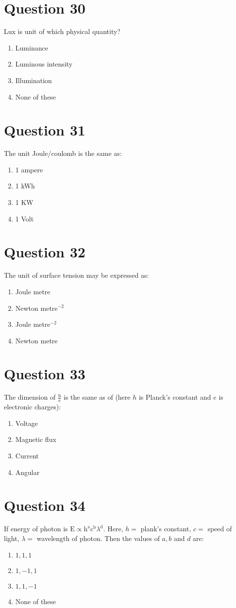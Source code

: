 \documentclass{article}
\begin{document}
\section*{Question 30}
Lux is unit of which physical quantity?
\begin{enumerate}[label=(\alph*)]
\item Luminance
\item Luminous intensity
\item Illumination
\item None of these
\end{enumerate}
\newpage
\section*{Question 31}
The unit Joule/coulomb is the same as:
\begin{enumerate}[label=(\alph*)]
\item 1 ampere
\item 1 kWh
\item 1 KW
\item 1 Volt
\end{enumerate}
\newpage
\section*{Question 32}
The unit of surface tension may be expressed as:
\begin{enumerate}[label=(\alph*)]
\item Joule metre
\item Newton metre\({ }^{-2}\)
\item Joule metre\({ }^{-2}\)
\item Newton metre
\end{enumerate}
\newpage
\section*{Question 33}
The dimension of \(\frac{\mathrm{h}}{\mathrm{e}}\) is the same as of (here \(h\) is Planck's constant and \(e\) is electronic charges):
\begin{enumerate}[label=(\alph*)]
\item Voltage
\item Magnetic flux
\item Current
\item Angular
\end{enumerate}
\newpage
\section*{Question 34}
If energy of photon is \(\mathrm{E} \propto \mathrm{h}^{\mathrm{a}} \mathrm{c}^{\mathrm{b}} \lambda^{\mathrm{d}}\). Here, \(h=\) plank's constant, \(c=\) speed of light, \(\lambda=\) wavelength of photon. Then the values of \(a, b\) and \(d\) are:
\begin{enumerate}[label=(\alph*)]
\item \(1,1,1\)
\item \(1,-1,1\)
\item \(1,1,-1\)
\item None of these
\end{enumerate}
\newpage
\end{document}
